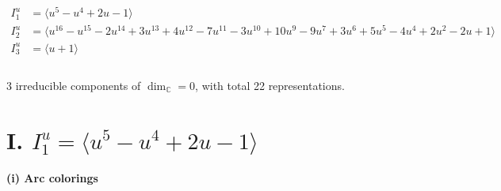 \documentclass[1p]{elsarticle_modified}
\theoremstyle{definition}
\begin{document}
\begin{align*}
I^u_{1}&=\langle 
u^5- u^4+2 u-1\rangle \\
I^u_{2}&=\langle 
u^{16}- u^{15}-2 u^{14}+3 u^{13}+4 u^{12}-7 u^{11}-3 u^{10}+10 u^9-9 u^7+3 u^6+5 u^5-4 u^4+2 u^2-2 u+1\rangle \\
I^u_{3}&=\langle 
u+1\rangle \\
\\
\end{align*}
\raggedright * 3 irreducible components of $\dim_{\mathbb{C}}=0$, with total 22 representations.\\
\newpage
\renewcommand{\arraystretch}{1}
\centering \section*{I. $I^u_{1}= \langle u^5- u^4+2 u-1 \rangle$}
\flushleft \textbf{(i) Arc colorings}\\
\end{document}
